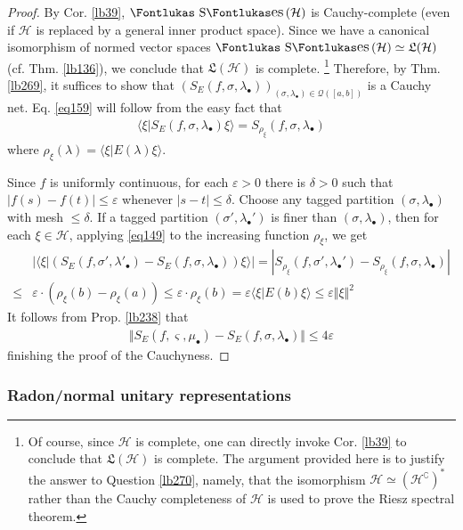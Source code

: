 \documentclass[12pt,b5paper,notitlepage]{article}
\theoremstyle{definition}
\theoremstyle{plain}
\DeclareMathOperator{\Ses}{\text{\Fontlukas S}\text{\kern -0pt {\Fontlukas\large es}}\,}
\newcommand{\fk}{\mathfrak}
\newcommand{\mc}{\mathcal}
\newcommand{\bk}[1]{\langle {#1}\rangle}
\newcommand{\bigbk}[1]{\big\langle {#1}\big\rangle}
\newcommand{\Co}{\complement}
\newcommand{\sgm}{\varsigma}
\newcommand{\blt}{\bullet}
\newcommand{\eps}{\varepsilon}
\newcommand{\MH}{\mathcal H}
\numberwithin{equation}{section}
\begin{document}
\begin{proof}
By Cor. \ref{lb39}, $\Ses(\MH)$ is Cauchy-complete (even if $\MH$ is replaced by a general inner product space). Since we have a canonical isomorphism of normed vector spaces $\Ses(\MH)\simeq\fk L(\MH)$ (cf. Thm. \ref{lb136}), we conclude that $\fk L(\MH)$ is complete. \footnote{Of course, since $\MH$ is complete, one can directly invoke Cor. \ref{lb39} to conclude that $\fk L(\MH)$ is complete. The argument provided here is to justify the answer to Question \ref{lb270}, namely, that the isomorphism $\MH\simeq(\MH^\Co)^*$ rather than the Cauchy completeness of $\MH$ is used to prove the Riesz spectral theorem.} Therefore, by Thm. \ref{lb269}, it suffices to show that $(S_E(f,\sigma,\lambda_\blt))_{(\sigma,\lambda_\blt)\in\mc Q([a,b])}$ is a Cauchy net. Eq. \ref{eq159} will follow from the easy fact that
\begin{align}
\bigbk{\xi\big|S_E(f,\sigma,\lambda_\blt)\xi}=S_{\rho_\xi}(f,\sigma,\lambda_\blt)
\end{align}
where $\rho_\xi(\lambda)=\bk{\xi|E(\lambda)\xi}$.



Since $f$ is uniformly continuous, for each $\eps>0$ there is $\delta>0$ such that $|f(s)-f(t)|\leq\eps$ whenever $|s-t|\leq\delta$. Choose any tagged partition $(\sigma,\lambda_\blt)$ with mesh $\leq\delta$. If a tagged partition $(\sigma',\lambda_\blt')$ is finer than $(\sigma,\lambda_\blt)$, then for each $\xi\in\MH$, applying \eqref{eq149} to the increasing function $\rho_\xi$, we get
\begin{align*}
&\Big|\bigbk{\xi\big|(S_E(f,\sigma',\lambda'_\blt)-S_E(f,\sigma,\lambda_\blt))\xi}\Big|=|S_{\rho_\xi}(f,\sigma',\lambda_\blt')-S_{\rho_\xi}(f,\sigma,\lambda_\blt)|\\
\leq& \eps\cdot(\rho_\xi(b)-\rho_\xi(a))\leq\eps\cdot\rho_\xi(b)=\eps\bk{\xi|E(b)\xi}\leq\eps\Vert\xi\Vert^2
\end{align*}
It follows from Prop. \ref{lb238} that
\begin{align*}
\Vert S_E(f,\sgm,\mu_\blt)-S_E(f,\sigma,\lambda_\blt)\Vert\leq 4\eps
\end{align*}
finishing the proof of the Cauchyness.
\end{proof}



\subsubsection{Radon/normal unitary representations}
\end{document}
